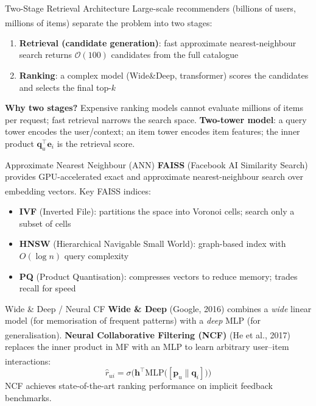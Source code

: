 \begin{v3topic}{Two-Stage Retrieval Architecture}
    Large-scale recommenders (billions of users, millions of items) separate the problem into two stages\textsuperscript{\cite[][pp.~95--100]{aggarwalRecommenderSystems2016}}:
    \begin{enumerate}
        \item \textbf{Retrieval (candidate generation)}: fast approximate nearest-neighbour search returns $\mathcal{O}(100)$ candidates from the full catalogue
        \item \textbf{Ranking}: a complex model (Wide\&Deep, transformer) scores the candidates and selects the final top-$k$
    \end{enumerate}
\visualseparator
    \textbf{Why two stages?} Expensive ranking models cannot evaluate millions of items per request; fast retrieval narrows the search space.
    \textbf{Two-tower model}: a query tower encodes the user/context; an item tower encodes item features; the inner product $\mathbf{q}_u^\top \mathbf{e}_i$ is the retrieval score.

\end{v3topic}
\begin{v3topic}{Approximate Nearest Neighbour (ANN)}
    \textbf{FAISS} (Facebook AI Similarity Search) provides GPU-accelerated exact and approximate nearest-neighbour search over embedding vectors\textsuperscript{\cite[][p.~535]{liFaissLibraryEfficient2019}}.
    Key FAISS indices:
    \begin{itemize}
        \item \textbf{IVF} (Inverted File): partitions the space into Voronoi cells; search only a subset of cells
        \item \textbf{HNSW} (Hierarchical Navigable Small World): graph-based index with $O(\log n)$ query complexity
        \item \textbf{PQ} (Product Quantisation): compresses vectors to reduce memory; trades recall for speed
    \end{itemize}

\end{v3topic}
\begin{v3topic}{Wide \& Deep / Neural CF}
    \textbf{Wide \& Deep} (Google, 2016) combines a \emph{wide} linear model (for memorisation of frequent patterns) with a \emph{deep} MLP (for generalisation)\textsuperscript{\cite[][p.~7]{chengWideDeepLearning2016}}.
    \textbf{Neural Collaborative Filtering (NCF)} (He et al., 2017) replaces the inner product in MF with an MLP to learn arbitrary user--item interactions\textsuperscript{\cite[][p.~173]{heNeuralCollaborativeFiltering2017}}:
    \begin{equation}
        \hat{r}_{ui} = \sigma\!\bigl(\mathbf{h}^\top \text{MLP}\bigl([\mathbf{p}_u \| \mathbf{q}_i]\bigr)\bigr)
    \end{equation}
    NCF achieves state-of-the-art ranking performance on implicit feedback benchmarks.

\end{v3topic}
